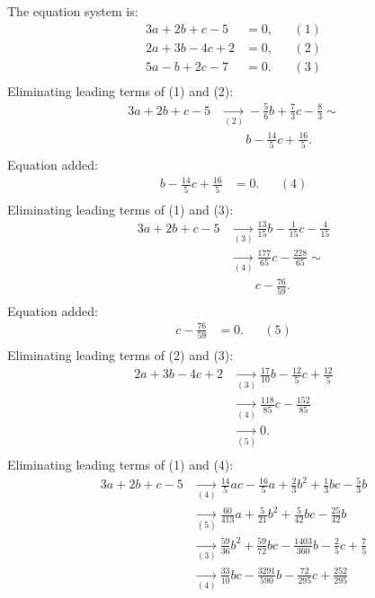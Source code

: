 {\scriptsize
The equation system is:
\begin{align*}
3a+2b+c-5&= 0, &&(1)\\
2a+3b-4c+2&= 0, &&(2)\\
5a-b+2c-7&= 0. &&(3)\\
\end{align*}
Eliminating leading terms of (1) and (2):
\begin{align*}
3a+2b+c-5&\underset{(2)}{\rightarrow}-\frac{5}{6}b+\frac{7}{3}c-\frac{8}{3}
\sim \\ &\qquad b-\frac{14}{5}c+\frac{16}{5}
.\\ \end{align*}
Equation added:
\begin{align*}
b-\frac{14}{5}c+\frac{16}{5}&= 0. &&(4)\\
\end{align*}
Eliminating leading terms of (1) and (3):
\begin{align*}
3a+2b+c-5&\underset{(3)}{\rightarrow}\frac{13}{15}b-\frac{1}{15}c-\frac{4}{15}
\\ &\underset{(4)}{\rightarrow}\frac{177}{65}c-\frac{228}{65}
\sim \\ &\qquad c-\frac{76}{59}
.\\ \end{align*}
Equation added:
\begin{align*}
c-\frac{76}{59}&= 0. &&(5)\\
\end{align*}
Eliminating leading terms of (2) and (3):
\begin{align*}
2a+3b-4c+2&\underset{(3)}{\rightarrow}\frac{17}{10}b-\frac{12}{5}c+\frac{12}{5}
\\ &\underset{(4)}{\rightarrow}\frac{118}{85}c-\frac{152}{85}
\\ &\underset{(5)}{\rightarrow}0
.\\ \end{align*}
Eliminating leading terms of (1) and (4):
\begin{align*}
3a+2b+c-5&\underset{(4)}{\rightarrow}\frac{14}{5}ac-\frac{16}{5}a+\frac{2}{3}b^{2}+\frac{1}{3}bc-\frac{5}{3}b
\\ &\underset{(5)}{\rightarrow}\frac{60}{413}a+\frac{5}{21}b^{2}+\frac{5}{42}bc-\frac{25}{42}b
\\ &\underset{(3)}{\rightarrow}\frac{59}{36}b^{2}+\frac{59}{72}bc-\frac{1403}{360}b-\frac{2}{5}c+\frac{7}{5}
\\ &\underset{(4)}{\rightarrow}\frac{33}{10}bc-\frac{3291}{590}b-\frac{72}{295}c+\frac{252}{295}

\end{align*}}
